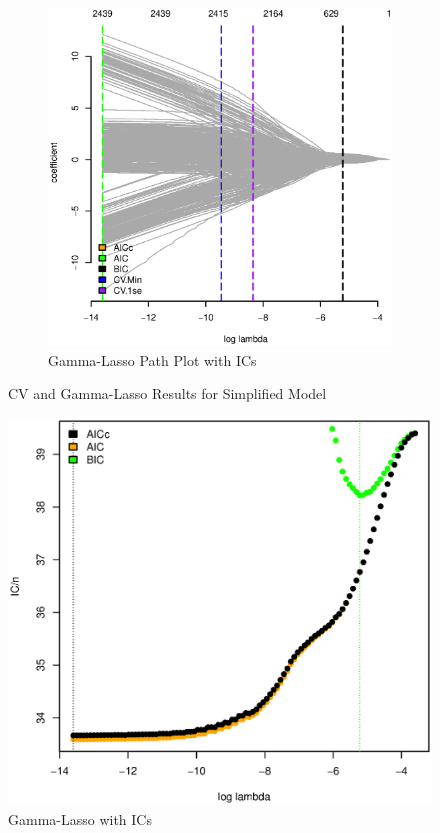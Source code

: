 \documentclass[11pt, fleqn]{article}
\begin{document}
\begin{figure}
\begin{subfigure}[b]{0.49\textwidth}
    \includegraphics[width=\textwidth]{ic_pl_nhl_c.eps}
    \caption{Gamma-Lasso Path Plot with ICs}
    \label{fig:pl_ic_nhl}
  \end{subfigure}
  \caption{CV and Gamma-Lasso Results for Simplified Model}
\end{figure}

\begin{figure}[!htb]
  \centering
  \includegraphics[scale=.5]{ic_pl_nhl_b.eps}
  \caption{Gamma-Lasso with ICs}
  \label{fig:pl_ic_nhl_b}
\end{figure}
\end{document}
